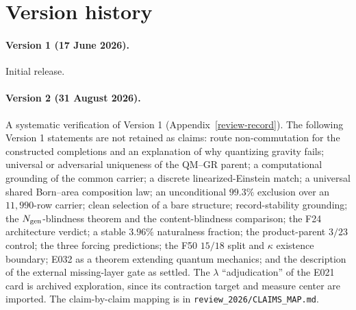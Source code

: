 \documentclass[11pt]{article}
\theoremstyle{definition}
\begin{document}
 \section{Version history}\label{adversarial-review-record}

\paragraph{Version 1 (17 June 2026).} Initial release.

\paragraph{Version 2 (31 August 2026).} A systematic verification of Version 1 (Appendix~\ref{review-record}). The
following Version 1 statements are not retained as claims: route non-commutation for the constructed completions and an
explanation of why quantizing gravity fails; universal or adversarial uniqueness of the QM--GR parent; a computational
grounding of the common carrier; a discrete linearized-Einstein match; a universal shared Born--area composition law;
an unconditional \(99.3\%\) exclusion over an \(11{,}990\)-row carrier; clean selection of a bare structure;
record-stability grounding; the \(N_{\rm gen}\)-blindness theorem and the content-blindness comparison; the F24
architecture verdict; a stable \(3.96\%\) naturalness fraction; the product-parent \(3/23\) control; the three forcing
predictions; the F50 \(15/18\) split and \(\kappa\) existence boundary; E032 as a theorem extending quantum mechanics;
and the description of the external missing-layer gate as settled. The \(\lambda\) ``adjudication'' of the E021 card
is archived exploration, since its contraction target and measure center are imported. The claim-by-claim mapping is
in \nolinkurl{review_2026/CLAIMS_MAP.md}.
\end{document}
